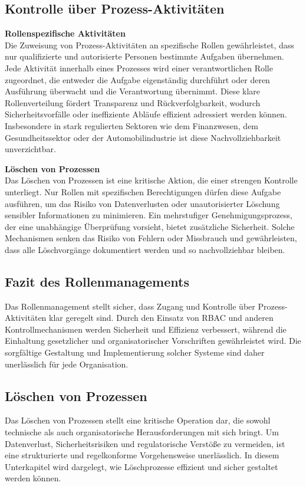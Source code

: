 \subsection*{Kontrolle über Prozess-Aktivitäten}
\textbf{Rollenspezifische Aktivitäten}\\
Die Zuweisung von Prozess-Aktivitäten an spezifische Rollen gewährleistet, dass nur qualifizierte und autorisierte Personen bestimmte Aufgaben übernehmen. Jede Aktivität innerhalb eines Prozesses wird einer verantwortlichen Rolle zugeordnet, die entweder die Aufgabe eigenständig durchführt oder deren Ausführung überwacht und die Verantwortung übernimmt.
Diese klare Rollenverteilung fördert Transparenz und Rückverfolgbarkeit, wodurch Sicherheitsvorfälle oder ineffiziente Abläufe effizient adressiert werden können. Insbesondere in stark regulierten Sektoren wie dem Finanzwesen, dem Gesundheitssektor oder der Automobilindustrie ist diese Nachvollziehbarkeit unverzichtbar. \cite[Vgl.][]{Sandhu1998} \cite[Vgl.][]{Sandhu}

\textbf{Löschen von Prozessen}\\
Das Löschen von Prozessen ist eine kritische Aktion, die einer strengen Kontrolle unterliegt. Nur Rollen mit spezifischen Berechtigungen dürfen diese Aufgabe ausführen, um das Risiko von Datenverlusten oder unautorisierter Löschung sensibler Informationen zu minimieren.
Ein mehrstufiger Genehmigungsprozess, der eine unabhängige Überprüfung vorsieht, bietet zusätzliche Sicherheit. Solche Mechanismen senken das Risiko von Fehlern oder Missbrauch und gewährleisten, dass alle Löschvorgänge dokumentiert werden und so nachvollziehbar bleiben. \cite[Vgl.][]{Sandhu1998} \cite[Vgl.][]{Sandhu} \cite[Vgl.][]{RedHat}

\subsection*{Fazit des Rollenmanagements}
Das Rollenmanagement stellt sicher, dass Zugang und Kontrolle über Prozess-Aktivitäten klar geregelt sind. Durch den Einsatz von \ac{RBAC} und anderen Kontrollmechanismen werden Sicherheit und Effizienz verbessert, während die Einhaltung gesetzlicher und organisatorischer Vorschriften gewährleistet wird. Die sorgfältige Gestaltung und Implementierung solcher Systeme sind daher unerlässlich für jede Organisation.


\subsection{Löschen von Prozessen}
Das Löschen von Prozessen stellt eine kritische Operation dar, die sowohl technische als auch organisatorische Herausforderungen mit sich bringt. Um Datenverlust, Sicherheitsrisiken und regulatorische Verstöße zu vermeiden, ist eine strukturierte und regelkonforme Vorgehensweise unerlässlich. In diesem Unterkapitel wird dargelegt, wie Löschprozesse effizient und sicher gestaltet werden können.

